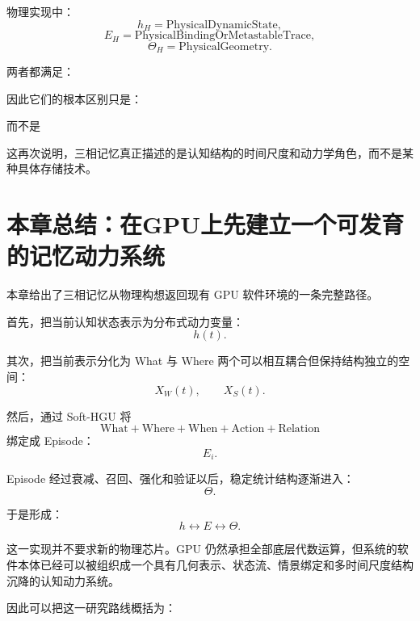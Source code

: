 物理实现中：
\[
h_H
=
\mathrm{PhysicalDynamicState},
\]
\[
E_H
=
\mathrm{PhysicalBindingOrMetastableTrace},
\]
\[
\Theta_H
=
\mathrm{PhysicalGeometry}.
\]

两者都满足：
\begin{statementbox}
\centering
{}
\end{statementbox}

因此它们的根本区别只是：
\begin{statementbox}
\centering
{}
\end{statementbox}
而不是
\begin{statementbox}
\centering
{}
\end{statementbox}

这再次说明，三相记忆真正描述的是认知结构的时间尺度和动力学角色，而不是某种具体存储技术。

\section{本章总结：在GPU上先建立一个可发育的记忆动力系统}

本章给出了三相记忆从物理构想返回现有 GPU 软件环境的一条完整路径。

首先，把当前认知状态表示为分布式动力变量：
\[
h(t).
\]

其次，把当前表示分化为 What 与 Where 两个可以相互耦合但保持结构独立的空间：
\[
X_W(t),
\qquad
X_S(t).
\]

然后，通过 Soft-HGU 将
\[
\mathrm{What}
+
\mathrm{Where}
+
\mathrm{When}
+
\mathrm{Action}
+
\mathrm{Relation}
\]
绑定成 Episode：
\[
E_i.
\]

Episode 经过衰减、召回、强化和验证以后，稳定统计结构逐渐进入：
\[
\Theta.
\]

于是形成：
\[
\boxed{
h
\leftrightarrow
E
\leftrightarrow
\Theta.
}
\]

这一实现并不要求新的物理芯片。GPU 仍然承担全部底层代数运算，但系统的软件本体已经可以被组织成一个具有几何表示、状态流、情景绑定和多时间尺度结构沉降的认知动力系统。

因此可以把这一研究路线概括为：
\begin{statementbox}
\centering
{}
\end{statementbox}

